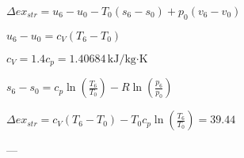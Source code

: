 \( \Delta ex_{str} = u_6 - u_0 - T_0 (s_6 - s_0) + p_0 (v_6 - v_0) \)  

\( u_6 - u_0 = c_V (T_6 - T_0) \)  

\( c_V = 1.4 c_p = 1.40684 \, \text{kJ/kg·K} \)  

\( s_6 - s_0 = c_p \ln \left( \frac{T_6}{T_0} \right) - R \ln \left( \frac{p_6}{p_0} \right) \)  

\( \Delta ex_{str} = c_V (T_6 - T_0) - T_0 c_p \ln \left( \frac{T_6}{T_0} \right) = 39.44 \)  

---